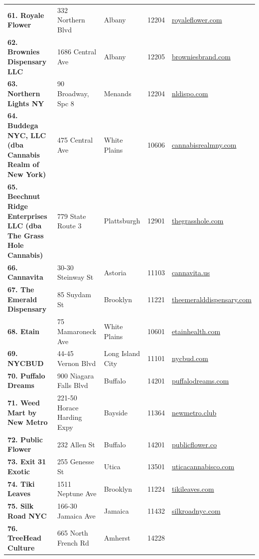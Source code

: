 \documentclass[
  letterpaper,
]{book}
\begin{document}
\begin{longtable}[]{@{}lllll@{}}
\textbf{61. Royale Flower} & 332 Northern Blvd & Albany & 12204 &
\href{https://royaleflower.com/menu/?dtche\%5Bpath\%5D=info}{royaleflower.com} \\
\textbf{62. Brownies Dispensary LLC} & 1686 Central Ave & Albany & 12205
& \href{https://browniesbrand.com}{browniesbrand.com} \\
\textbf{63. Northern Lights NY} & 90 Broadway, Spc 8 & Menands & 12204 &
\href{https://www.nldispo.com/}{nldispo.com} \\
\textbf{64. Buddega NYC, LLC (dba Cannabis Realm of New York)} & 475
Central Ave & White Plains & 10606 &
\href{https://cannabisrealmny.com}{cannabisrealmny.com} \\
\textbf{65. Beechnut Ridge Enterprises LLC (dba The Grass Hole
Cannabis)} & 779 State Route 3 & Plattsburgh & 12901 &
\href{https://thegrasshole.com}{thegrasshole.com} \\
\textbf{66. Cannavita} & 30-30 Steinway St & Astoria & 11103 &
\href{https://cannavita.us}{cannavita.us} \\
\textbf{67. The Emerald Dispensary} & 85 Suydam St & Brooklyn & 11221 &
\href{https://theemeralddispensary.com}{theemeralddispensary.com} \\
\textbf{68. Etain~} & 75 Mamaroneck Ave & White Plains & 10601 &
\href{https://etainhealth.com/}{etainhealth.com} \\
\textbf{69. NYCBUD} & 44-45 Vernon Blvd & Long Island City & 11101 &
\href{https://www.nycbud.com}{nycbud.com} \\
\textbf{70. Puffalo Dreams} & 900 Niagara Falls Blvd & Buffalo & 14201 &
\href{https://puffalodreams.com}{puffalodreams.com} \\
\textbf{71. Weed Mart by New Metro} & 221-50 Horace Harding Expy &
Bayside & 11364 & \href{https://newmetro.club}{newmetro.club} \\
\textbf{72. Public Flower} & 232 Allen St & Buffalo & 14201 &
\href{https://publicflower.co}{publicflower.co} \\
\textbf{73. Exit 31 Exotic} & 255 Genesse St & Utica & 13501 &
\href{https://www.uticacannabisco.com}{uticacannabisco.com} \\
\textbf{74. Tiki Leaves} & 1511 Neptune Ave & Brooklyn & 11224 &
\href{http://www.tikileaves.com}{tikileaves.com} \\
\textbf{75. Silk Road NYC} & 166-30 Jamaica Ave & Jamaica & 11432 &
\href{https://silkroadnyc.com/}{silkroadnyc.com} \\
\textbf{76. TreeHead Culture~} & 665 North French Rd & Amherst & 14228 &

\end{longtable}
\end{document}
